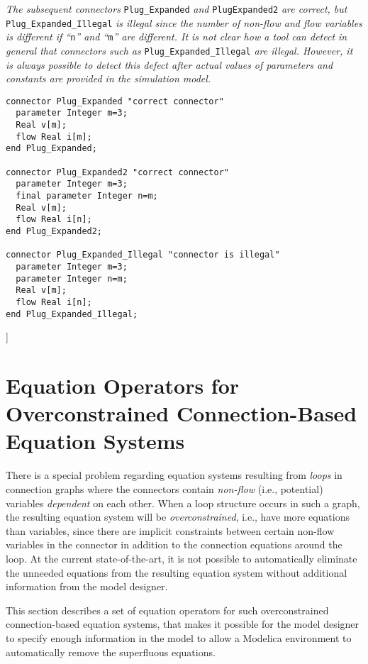 \emph{The subsequent connectors} \lstinline!Plug_Expanded! \emph{and} \lstinline!PlugExpanded2!
\emph{are correct, but} \lstinline!Plug_Expanded_Illegal! \emph{is illegal since
the number of non-flow and flow variables is different if ``}\lstinline!n!\emph{''
and ``}\lstinline!m!\emph{'' are different. It is not clear how a tool can detect in
general that connectors such as} \lstinline!Plug_Expanded_Illegal! \emph{are
illegal. However, it is always possible to detect this defect after
actual values of parameters and constants are provided in the simulation
model.}

\begin{lstlisting}[language=modelica]
connector Plug_Expanded "correct connector"
  parameter Integer m=3;
  Real v[m];
  flow Real i[m];
end Plug_Expanded;

connector Plug_Expanded2 "correct connector"
  parameter Integer m=3;
  final parameter Integer n=m;
  Real v[m];
  flow Real i[n];
end Plug_Expanded2;

connector Plug_Expanded_Illegal "connector is illegal"
  parameter Integer m=3;
  parameter Integer n=m;
  Real v[m];
  flow Real i[n];
end Plug_Expanded_Illegal;
\end{lstlisting}

{]}

\section{Equation Operators for Overconstrained Connection-Based Equation Systems}

There is a special problem regarding equation systems resulting from
\emph{loops} in connection graphs where the connectors contain
\emph{non-flow} (i.e., potential) variables \emph{dependent} on each
other. When a loop structure occurs in such a graph, the resulting
equation system will be \emph{overconstrained}, i.e., have more
equations than variables, since there are implicit constraints between
certain non-flow variables in the connector in addition to the
connection equations around the loop. At the current state-of-the-art,
it is not possible to automatically eliminate the unneeded equations
from the resulting equation system without additional information from
the model designer.

This section describes a set of equation operators for such
overconstrained connection-based equation systems, that makes it
possible for the model designer to specify enough information in the
model to allow a Modelica environment to automatically remove the
superfluous equations.

